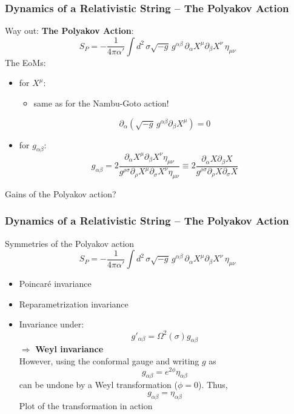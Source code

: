 \documentclass[aspectratio=169]{beamer}
\begin{document}
	\begin{frame}
		\frametitle{Dynamics of a Relativistic String -- The Polyakov Action}
		Way out: \textbf{The Polyakov Action}:
		\begin{equation*}
			S_P = -\frac{1}{4\pi\alpha'}\int d^2 \, \sigma \sqrt{-g} \, g^{\alpha\beta}\,\partial_\alpha X^\mu \partial_\beta X^\nu \, \eta_{\mu\nu}
		\end{equation*}
		The EoMs:
		\begin{itemize}
			\item for $X^\mu$:
			\begin{itemize}
				\item same as for the Nambu-Goto action!
			\end{itemize}
			\begin{equation*}
				\partial_\alpha\left(\sqrt{-g}\,g^{\alpha\beta}\partial_\beta X^{\mu}\right) = 0
			\end{equation*}
			\item for $g_{\alpha\beta}$:
			\begin{equation*}
				g_{\alpha\beta} = 2 \frac{\partial_\alpha X^\mu \partial_\beta X^\nu \eta_{\mu\nu} }{g^{\rho\sigma}\partial_\rho X^\mu \partial_\sigma X^\nu \eta_{\mu\nu}} \equiv 2 \frac{\partial_\alpha X \partial_\beta X}{g^{\rho\sigma}\partial_\rho X \partial_\sigma X}
			\end{equation*}
		\end{itemize}
		Gains of the Polyakov action?
	\end{frame}

	\begin{frame}
		\frametitle{Dynamics of a Relativistic String -- The Polyakov Action}
		Symmetries of the Polyakov action
		\begin{equation*}
			S_P = -\frac{1}{4\pi\alpha'}\int d^2 \, \sigma \sqrt{-g} \, g^{\alpha\beta}\,\partial_\alpha X^\mu \partial_\beta X^\nu \, \eta_{\mu\nu}
		\end{equation*}
		\begin{itemize}
			\item Poincaré invariance
			\item Reparametrization invariance
			\item Invariance under:
			\begin{equation*}
				g'_{\alpha\beta} = \Omega^2(\sigma) g_{\alpha\beta}
			\end{equation*}
			$\Rightarrow$ \textbf{Weyl invariance}\\
			However, using the conformal gauge and writing $g$ as
			\begin{equation*}
				g_{\alpha\beta} = e^{2\phi}\eta_{\alpha\beta}
			\end{equation*}
			can be undone by a Weyl transformation ($\phi=0$). Thus,
			\begin{equation*}
				g_{\alpha\beta} = \eta_{\alpha\beta}
			\end{equation*}
			\color{red} Plot of the transformation in action
		\end{itemize}
		
	\end{frame}	
	
\end{document}
